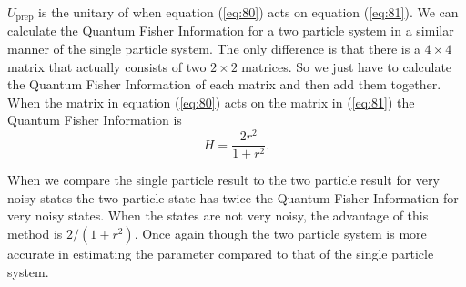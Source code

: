 \documentclass[twocolumn]{article}
\begin{document}
$U_{\text{prep}}$ is the unitary of when equation (\ref{eq:80}) acts on equation (\ref{eq:81}). We can calculate the Quantum Fisher Information for a two particle system in a similar manner of the single particle system. The only difference is that there is a $4\times4$ matrix that actually consists of two $2\times2$ matrices. So we just have to calculate the Quantum Fisher Information of each matrix and then add them together. When the matrix in equation (\ref{eq:80}) acts on the matrix in (\ref{eq:81}) the Quantum Fisher Information is
\begin{equation} \label{eq:82}
H=\frac{2r^2}{1+r^2}.
\end{equation}

When we compare the single particle result to the two particle result for very noisy states the two particle state has twice the Quantum Fisher Information for very noisy states. When the states are not very noisy, the advantage of this method is $2/(1+r^2)$. Once again though the two particle system is more accurate in estimating the parameter compared to that of the single particle system. %
\end{document}
